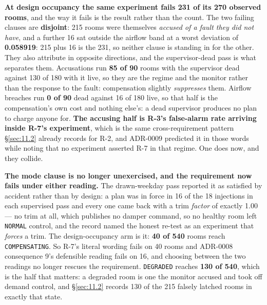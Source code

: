 \textbf{At design occupancy the same experiment fails 231 of its 270 observed rooms}, and the way it
fails is the result rather than the count. The two failing clauses are \textbf{disjoint}: 215 rooms
were themselves \emph{accused of a fault they did not have}, and a further 16 sat outside the
airflow band at a worst deviation of \textbf{0.058919}: 215 plus 16 is the 231, so neither clause
is standing in for the other. They also attribute in opposite directions, and the supervisor-dead
pass is what separates them. Accusations run \textbf{85 of 90} rooms with the supervisor dead against
130 of 180 with it live, so they are the regime and the monitor rather than the response to the
fault: compensation slightly \emph{suppresses} them. Airflow breaches run \textbf{0 of 90} dead
against 16 of 180 live, so that half is the compensation's own cost and nothing else's: a dead
supervisor produces no plan to charge anyone for. \textbf{The accusing half is R-3's false-alarm
rate arriving inside R-7's experiment}, which is the same cross-requirement pattern §\ref{sec:11.2} already
records for R-2, and ADR-0009 predicted it in those words while noting that no experiment asserted
R-7 in that regime. One does now, and they collide.

\textbf{The mode clause is no longer unexercised, and the requirement now fails under either
reading.} The drawn-weekday pass reported it as satisfied by accident rather than by design: a plan
was in force in 16 of the 18 injections in each supervised pass and every one came back with a trim
\emph{factor} of exactly 1.00 — no trim at all, which publishes no damper command, so no healthy
room left \texttt{NORMAL} control, and the
record named the honest re-test as an experiment that \emph{forces} a trim. The design-occupancy arm
is it: \textbf{40 of 540} rooms reach \texttt{COMPENSATING}. So R-7's literal wording fails on 40
rooms and ADR-0008 consequence 9's defensible reading fails on 16, and choosing between the two
readings no longer rescues the requirement. \texttt{DEGRADED} reaches \textbf{130 of 540}, which is
the half that matters: a degraded room is one the monitor accused and took off demand control, and
§\ref{sec:11.2} records 130 of the 215 falsely latched rooms in exactly that state.

